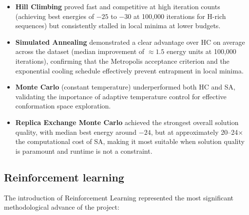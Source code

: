 \begin{itemize}
    \item \textbf{Hill Climbing} proved fast and competitive at high iteration counts (achieving best energies of $-25$ to $-30$ at 100,000 iterations for H-rich sequences) but consistently stalled in local minima at lower budgets.
    \item \textbf{Simulated Annealing} demonstrated a clear advantage over HC on average across the dataset (median improvement of $\approx 1.5$ energy units at 100,000 iterations), confirming that the Metropolis acceptance criterion and the exponential cooling schedule effectively prevent entrapment in local minima.
    \item \textbf{Monte Carlo} (constant temperature) underperformed both HC and SA, validating the importance of adaptive temperature control for effective conformation space exploration.
    \item \textbf{Replica Exchange Monte Carlo} achieved the strongest overall solution quality, with median best energy around $-24$, but at approximately 20--24$\times$ the computational cost of SA, making it most suitable when solution quality is paramount and runtime is not a constraint.
\end{itemize}

\subsection{Reinforcement learning}
\label{conclusion:sub_rl}

The introduction of Reinforcement Learning represented the most significant methodological advance of the project:

